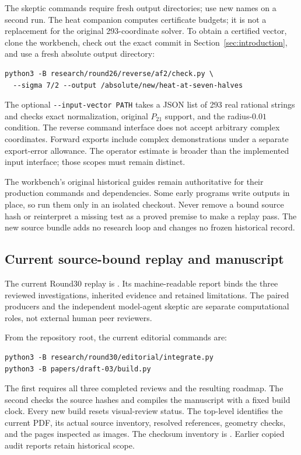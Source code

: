 The skeptic commands require fresh output directories; use new names on a second run. The heat companion computes certificate budgets; it is not a replacement for the original 293-coordinate solver. To obtain a certified vector, clone the workbench, check out the exact commit in Section~\ref{sec:introduction}, and use a fresh absolute output directory:
\begin{verbatim}
python3 -B research/round26/reverse/af2/check.py \
  --sigma 7/2 --output /absolute/new/heat-at-seven-halves
\end{verbatim}
The optional \verb|--input-vector PATH| takes a JSON list of 293 real rational strings and checks exact normalization, original $P_{21}$ support, and the radius-$0.01$ condition. The reverse command interface does not accept arbitrary complex coordinates. Forward exports include complex demonstrations under a separate export-error allowance. The operator estimate is broader than the implemented input interface; those scopes must remain distinct.

The workbench's original historical guides remain authoritative for their production commands and dependencies. Some early programs write outputs in place, so run them only in an isolated checkout. Never remove a bound source hash or reinterpret a missing test as a proved premise to make a replay pass. The new source bundle adds no research loop and changes no frozen historical record.

\subsection{Current source-bound replay and manuscript}
The current Round30 replay is . Its machine-readable report binds the three reviewed investigations, inherited evidence and retained limitations. The paired producers and the independent model-agent skeptic are separate computational roles, not external human peer reviewers.

From the repository root, the current editorial commands are:
\begin{verbatim}
python3 -B research/round30/editorial/integrate.py
python3 -B papers/draft-03/build.py
\end{verbatim}
The first requires all three completed reviews and the resulting roadmap. The second checks the source hashes and compiles the manuscript with a fixed build clock. Every new build resets visual-review status. The top-level  identifies the current PDF, its actual source inventory, resolved references, geometry checks, and the pages inspected as images. The checksum inventory is . Earlier copied audit reports retain historical scope.
